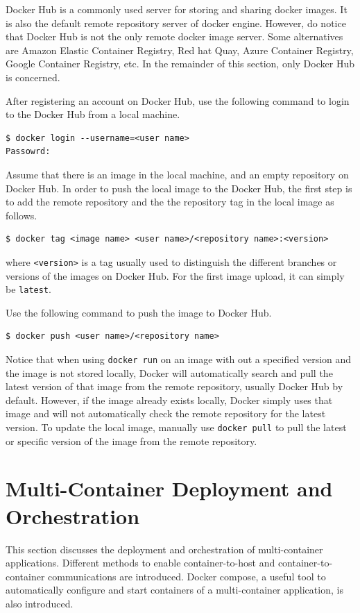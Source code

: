 Docker Hub is a commonly used server for storing and sharing docker images. It is also the default remote repository server of docker engine. However, do notice that Docker Hub is not the only remote docker image server. Some alternatives are Amazon Elastic Container Registry, Red hat Quay, Azure Container Registry, Google Container Registry, etc. In the remainder of this section, only Docker Hub is concerned.

After registering an account on Docker Hub, use the following command to login to the Docker Hub from a local machine.
\begin{lstlisting}
$ docker login --username=<user name>
Passowrd:
\end{lstlisting}

Assume that there is an image in the local machine, and an empty repository on Docker Hub. In order to push the local image to the Docker Hub, the first step is to add the remote repository and the the repository tag in the local image as follows.
\begin{lstlisting}
$ docker tag <image name> <user name>/<repository name>:<version>
\end{lstlisting}
where \verb|<version>| is a tag usually used to distinguish the different branches or versions of the images on Docker Hub. For the first image upload, it can simply be \verb|latest|.

Use the following command to push the image to Docker Hub.
\begin{lstlisting}
$ docker push <user name>/<repository name>
\end{lstlisting}

Notice that when using \verb|docker run| on an image with out a specified version and the image is not stored locally, Docker will automatically search and pull the latest version of that image from the remote repository, usually Docker Hub by default. However, if the image already exists locally, Docker simply uses that image and will not automatically check the remote repository for the latest version. To update the local image, manually use \verb|docker pull| to pull the latest or specific version of the image from the remote repository.

\section{Multi-Container Deployment and Orchestration}

This section discusses the deployment and orchestration of multi-container applications. Different methods to enable container-to-host and container-to-container communications are introduced. Docker compose, a useful tool to automatically configure and start containers of a multi-container application, is also introduced.

